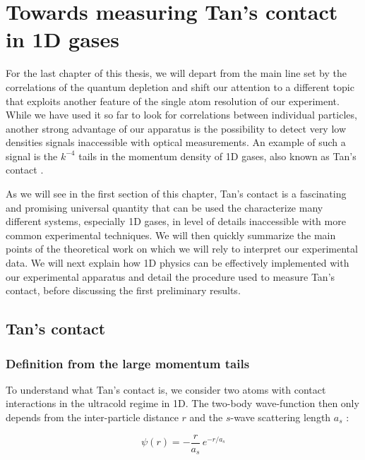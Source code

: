 \chapterimage{}

\chapter{Towards measuring Tan's contact in 1D gases}

For the last chapter of this thesis, we will depart from the main line set by the \kmk correlations of the quantum depletion and shift our attention to a different topic that exploits another feature of the single atom resolution of our experiment. While we have used it so far to look for correlations between individual particles, another strong advantage of our apparatus is the possibility to detect very low densities signals inaccessible with optical measurements. An example of such a signal is the $k^{-4}$ tails in the momentum density of 1D gases, also known as Tan's contact \cite{tan2008large}. 

As we will see in the first section of this chapter, Tan's contact is a fascinating and promising universal quantity that can be used the characterize many different systems, especially 1D gases, in level of details inaccessible with more common experimental techniques. We will then quickly summarize the main points of the theoretical work \cite{yao2018tan} on which we will rely to interpret our experimental data. We will next explain how 1D physics can be effectively implemented with our experimental apparatus and detail the procedure used to measure Tan's contact, before discussing the first preliminary results.


\section{Tan's contact}

\subsection{Definition from the large momentum tails}

To understand what Tan's contact is, we consider two atoms with contact interactions in the ultracold regime in 1D. The two-body wave-function then only depends from the inter-particle distance $r$ and the $s$-wave scattering length $a_s$ \cite{viverit2004momentum}:

\begin{equation}
    \psi(r) = - \frac{r}{a_s} \, e^{-r/a_s}
\end{equation}

